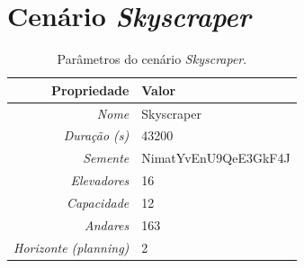 \section{Cenário \textit{Skyscraper}}

\lipsum[1]

\begin{table}[htb!]
\centering
\caption{Parâmetros do cenário \textit{Skyscraper}.}
\label{tab:results:skyscraper:params}
\begin{tabular}{|r|l|}
\hline
\textbf{Propriedade}          & \textbf{Valor}       \\ \hline
\textit{Nome}                 & Skyscraper           \\ \hline
\textit{Duração (s)}          & 43200                \\ \hline
\textit{Semente}              & NimatYvEnU9QeE3GkF4J \\ \hline
\textit{Elevadores}           & 16                   \\ \hline
\textit{Capacidade}           & 12                   \\ \hline
\textit{Andares}              & 163                  \\ \hline
\textit{Horizonte (planning)} & 2                    \\ \hline
\end{tabular}
\end{table}

